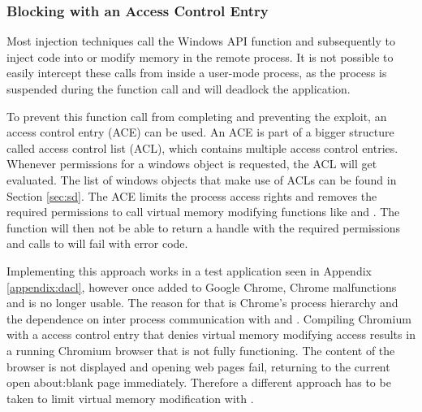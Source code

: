 \subsubsection{Blocking  with an Access Control Entry}
\label{sec:dacl}
Most injection techniques call the Windows API function  and subsequently  to inject code into or modify memory in the remote process. It is not possible to easily intercept these calls from inside a user-mode process, as the process is suspended during the  function call and will deadlock the application.

\medskip

To prevent this function call from completing and preventing the exploit, an access control entry (ACE) can be used. An ACE is part of a bigger structure called access control list (ACL), which contains multiple access control entries. Whenever permissions for a windows object is requested, the ACL will get evaluated. The list of windows objects that make use of ACLs can be found in Section \ref{sec:sd}. The ACE limits the process access rights and removes the required permissions to call virtual memory modifying functions like  and . The  function will then not be able to return a handle with the required permissions and calls to  will fail with  error code.

\medskip

Implementing this approach works in a test application seen in Appendix \ref{appendix:dacl}, however once added to Google Chrome, Chrome malfunctions and is no longer usable. The reason for that is Chrome's process hierarchy and the dependence on inter process communication with  and . Compiling Chromium with a access control entry that denies virtual memory modifying access results in a running Chromium browser that is not fully functioning. The content of the browser is not displayed and opening web pages fail, returning to the current open about:blank page immediately. Therefore a different approach has to be taken to limit virtual memory modification with .
